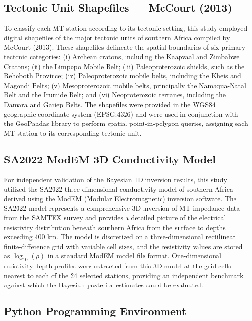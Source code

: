 \subsection*{Tectonic Unit Shapefiles --- McCourt (2013)}

To classify each MT station according to its tectonic setting, this study employed digital shapefiles of the major tectonic units of southern Africa compiled by McCourt (2013). These shapefiles delineate the spatial boundaries of six primary tectonic categories: (i) Archean cratons, including the Kaapvaal and Zimbabwe Cratons; (ii) the Limpopo Mobile Belt; (iii) Paleoproterozoic shields, such as the Rehoboth Province; (iv) Paleoproterozoic mobile belts, including the Kheis and Magondi Belts; (v) Mesoproterozoic mobile belts, principally the Namaqua-Natal Belt and the Irumide Belt; and (vi) Neoproterozoic terranes, including the Damara and Gariep Belts. The shapefiles were provided in the WGS84 geographic coordinate system (EPSG:4326) and were used in conjunction with the GeoPandas library to perform spatial point-in-polygon queries, assigning each MT station to its corresponding tectonic unit.

\subsection*{SA2022 ModEM 3D Conductivity Model}

For independent validation of the Bayesian 1D inversion results, this study utilized the SA2022 three-dimensional conductivity model of southern Africa, derived using the ModEM (Modular Electromagnetic) inversion software. The SA2022 model represents a comprehensive 3D inversion of MT impedance data from the SAMTEX survey and provides a detailed picture of the electrical resistivity distribution beneath southern Africa from the surface to depths exceeding 400 km. The model is discretized on a three-dimensional rectilinear finite-difference grid with variable cell sizes, and the resistivity values are stored as $\log_{10}(\rho)$ in a standard ModEM model file format. One-dimensional resistivity-depth profiles were extracted from this 3D model at the grid cells nearest to each of the 24 selected stations, providing an independent benchmark against which the Bayesian posterior estimates could be evaluated.

\subsection*{Python Programming Environment}

